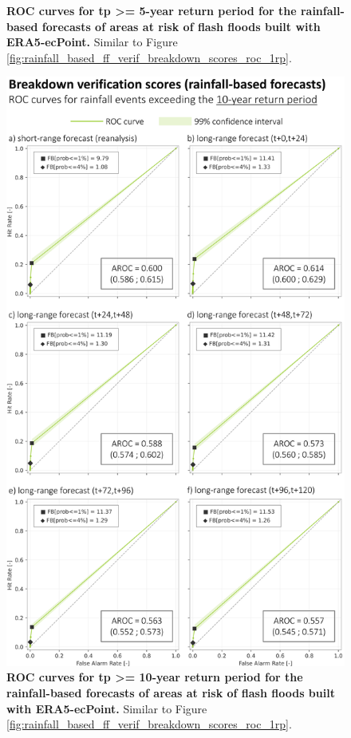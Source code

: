 \begin{figure}[htbp]
\caption{\textbf{ROC curves for tp >= 5-year return period for the rainfall-based forecasts of areas at risk of flash floods built with ERA5-ecPoint.} Similar to Figure \ref{fig:rainfall_based_ff_verif_breakdown_scores_roc_1rp}.}
\label{fig:rainfall_based_ff_verif_breakdown_scores_roc_5rp}
\end{figure}

\begin{figure}[htbp]
\centering
\includegraphics[width=\textwidth]{chapter_05/figures/rainfall_based_ff_verif_breakdown_scores_roc_10rp.png}
\caption{\textbf{ROC curves for tp >= 10-year return period for the rainfall-based forecasts of areas at risk of flash floods built with ERA5-ecPoint.} Similar to Figure \ref{fig:rainfall_based_ff_verif_breakdown_scores_roc_1rp}.}
\label{fig:rainfall_based_ff_verif_breakdown_scores_roc_10rp}
\end{figure}

